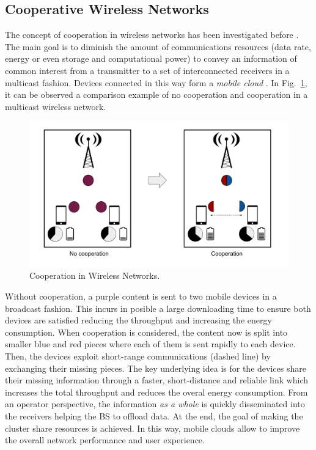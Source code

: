 \subsection{Cooperative Wireless Networks}
The concept of cooperation in wireless networks has been investigated before \cite{fitzek2006cooperation,fitzek2007cognitive,heide2012green,fitzek2013implementation,fitzek2013mobile}. The main goal is to diminish the amount of communications resources (data rate, energy or even storage and computational power) to convey an information of common interest from a transmitter to a set of interconnected receivers in a multicast fashion. Devices connected in this way form a \textit{mobile cloud} \cite{fitzek2013mobile}. In Fig.~\ref{fig:cooperation}, it can be observed a comparison example of no cooperation and cooperation in a multicast wireless network.

\begin{figure}[ht!]
  \centering 
  \includegraphics[width=\textwidth]{introduction/figures/cooperation.pdf}
  \caption{Cooperation in Wireless Networks.}
\label{fig:cooperation}
\end{figure} 

Without cooperation, a purple content is sent to two mobile devices in a broadcast fashion. This incurs in posible a large downloading time to ensure both devices are satisfied reducing the throughput and increasing the energy consumption.  When cooperation is considered, the content now is split into smaller blue and red pieces where each of them is sent rapidly to each device. Then, the devices exploit short-range communications (dashed line) by exchanging their missing pieces. The key underlying idea is for the devices share their missing information through a faster, short-distance and reliable link which increases the total throughput and reduces the overal energy consumption. From an operator perspective, the information \textit{as a whole} is quickly disseminated into the receivers helping the \ac{BS} to offload data. At the end, the goal of making the cluster share resources is achieved. In this way, mobile clouds allow to improve the overall network performance and user experience.

